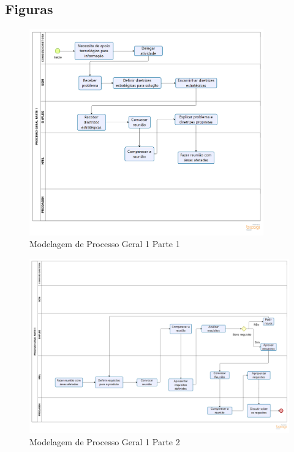 \begin{apendicesenv}
    \partapendices

    \chapter{Figuras}
    \label{ch:figuras}

    \begin{figure}[H]
        \centering
        \includegraphics[width=0.9\textwidth]{figuras/modelagemProcessoGeralParte1.png}
        \caption{Modelagem de Processo Geral 1 Parte 1}
        \label{img:modelagemProcessoGeral1Parte1}
    \end{figure}

    \begin{landscape}
        \begin{figure}[H]
            \centering
            \includegraphics[width=1.3\textwidth]{figuras/modelagemProcessoGeralParte2.png}
            \caption{Modelagem de Processo Geral 1 Parte 2}
            \label{img:modelagemProcessoGeral1Parte2}
        \end{figure}
    \end{landscape}


\end{apendicesenv}
